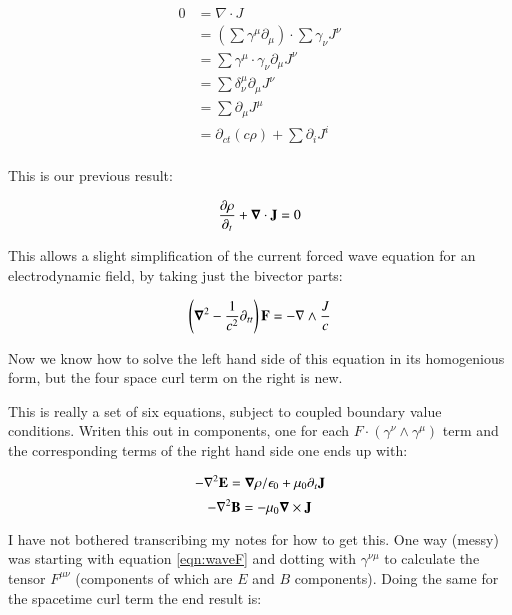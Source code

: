 \documentclass{article}      %
\newcommand{\spacegrad}[0]{\boldsymbol{\nabla}}
\newcommand{\grad}[0]{\nabla}
\begin{document}
\begin{align*}
0 
&= \grad \cdot J \\
&= (\sum \gamma^{\mu} \partial_{\mu}) \cdot \sum \gamma_{\nu} J^{\nu} \\
&= \sum \gamma^{\mu} \cdot \gamma_{\nu} \partial_{\mu} J^{\nu} \\
&= \sum \delta^{\mu}_{\nu} \partial_{\mu} J^{\nu} \\
&= \sum \partial_{\mu} J^{\mu} \\
&= \partial_{ct}(c \rho) + \sum \partial_{i} J^{i} \\
\end{align*}

This is our previous result:

\begin{equation}
\frac{\partial \rho}{\partial_{t}} + \spacegrad \cdot \BJ = 0
\end{equation}

This allows a slight simplification of the current forced wave equation for an electrodynamic field, by taking just the bivector
parts:

\begin{equation}\label{eqn:waveF}
\left(\spacegrad^2 - \inv{c^2}\partial_{tt}\right) \BF = -\grad \wedge \frac{J}{c}
\end{equation}

Now we know how to solve the left hand side of this equation in its homogenious form, but the four space curl term on the right is
new.

This is really a set of six equations, subject to coupled boundary value conditions.  Writen this out in components, one for each $F \cdot (\gamma^{\nu} \wedge \gamma^{\mu})$ term and the corresponding terms of the right hand side one ends up with:

\begin{equation*}
-\grad^2 \BE = \spacegrad \rho/\epsilon_0 + \mu_0 \partial_t{\BJ}
\end{equation*}
\begin{equation*}
-\grad^2 \BB = -\mu_0 \spacegrad \cross \BJ
\end{equation*}

I have not bothered transcribing my notes for how to get this.  One way (messy) was starting with equation \ref{eqn:waveF} and dotting with $\gamma^{\nu \mu}$ to calculate the tensor $F^{\mu\nu}$ (components of which are $E$ and $B$ components).  Doing the same for the spacetime curl term the end result is:
\end{document}
